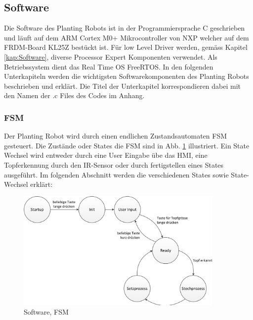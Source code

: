 \subsection{Software} \label{sec:Software}
Die Software des Planting Robots ist in der Programmiersprache C geschrieben und läuft auf dem ARM Cortex M0+ Mikrocontroller von NXP welcher auf dem FRDM-Board KL25Z bestückt ist. Für low Level Driver werden, gemäss Kapitel \ref{kap:Software}, diverse Processor Expert Komponenten verwendet. Als Betriebssystem dient das Real Time OS FreeRTOS. In den folgenden Unterkapiteln werden die wichtigsten Softwarekomponenten des Planting Robots beschrieben und erklärt. Die Titel der Unterkapitel korrespondieren dabei mit den Namen der .c Files des Codes im Anhang.

\subsubsection{FSM} \label{sec:FSM}
Der Planting Robot wird durch einen endlichen Zustandsautomaten FSM gesteuert. Die Zustände oder States die FSM sind in Abb. \ref{fig:FSM} illustriert. Ein State Wechsel wird entweder durch eine User Eingabe übe das HMI, eine Topferkennung durch den IR-Sensor oder durch fertigstellen eines States ausgeführt. Im folgenden Abschnitt werden die verschiedenen States sowie State-Wechsel erklärt:

\begin{figure}[H]
	\includegraphics[width=0.9\textwidth]{Illustrationen/6-Umsetzung/FSM_B&W_breit.png}
	\caption{Software, FSM}
	\label{fig:FSM}
\end{figure}

